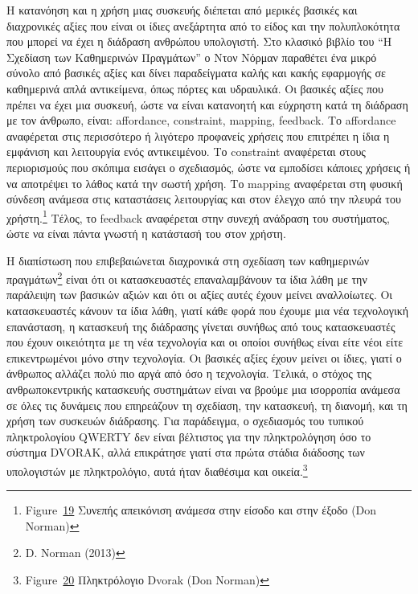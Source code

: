 \documentclass[
]{article}
\begin{document}
Η κατανόηση και η χρήση μιας συσκευής διέπεται από μερικές βασικές και
διαχρονικές αξίες που είναι οι ίδιες ανεξάρτητα από το είδος και την
πολυπλοκότητα που μπορεί να έχει η διάδραση ανθρώπου υπολογιστή. Στο
κλασικό βιβλίο του ``Η Σχεδίαση των Καθημερινών Πραγμάτων'' ο Ντον
Νόρμαν παραθέτει ένα μικρό σύνολο από βασικές αξίες και δίνει
παραδείγματα καλής και κακής εφαρμογής σε καθημερινά απλά αντικείμενα,
όπως πόρτες και υδραυλικά. Οι βασικές αξίες που πρέπει να έχει μια
συσκευή, ώστε να είναι κατανοητή και εύχρηστη κατά τη διάδραση με τον
άνθρωπο, είναι: affordance, constraint, mapping, feedback. Το affordance
αναφέρεται στις περισσότερο ή λιγότερο προφανείς χρήσεις που επιτρέπει η
ίδια η εμφάνιση και λειτουργία ενός αντικειμένου. Το constraint
αναφέρεται στους περιορισμούς που σκόπιμα εισάγει ο σχεδιασμός, ώστε να
εμποδίσει κάποιες χρήσεις ή να αποτρέψει το λάθος κατά την σωστή χρήση.
Το mapping αναφέρεται στη φυσική σύνδεση ανάμεσα στις καταστάσεις
λειτουργίας και στον έλεγχο από την πλευρά του χρήστη.\footnote{Figure~\protect\hyperlink{fig:mapping-principle}{19}
  Συνεπής απεικόνιση ανάμεσα στην είσοδο και στην έξοδο (Don Norman)}
Τέλος, το feedback αναφέρεται στην συνεχή ανάδραση του συστήματος, ώστε
να είναι πάντα γνωστή η κατάστασή του στον χρήστη.

Η διαπίστωση που επιβεβαιώνεται διαχρονικά στη σχεδίαση των καθημερινών
πραγμάτων\footnote{D. Norman (2013)} είναι ότι οι κατασκευαστές
επαναλαμβάνουν τα ίδια λάθη με την παράλειψη των βασικών αξιών και ότι
οι αξίες αυτές έχουν μείνει αναλλοίωτες. Οι κατασκευαστές κάνουν τα ίδια
λάθη, γιατί κάθε φορά που έχουμε μια νέα τεχνολογική επανάσταση, η
κατασκευή της διάδρασης γίνεται συνήθως από τους κατασκευαστές που έχουν
οικειότητα με τη νέα τεχνολογία και οι οποίοι συνήθως είναι είτε νέοι
είτε επικεντρωμένοι μόνο στην τεχνολογία. Οι βασικές αξίες έχουν μείνει
οι ίδιες, γιατί ο άνθρωπος αλλάζει πολύ πιο αργά από όσο η τεχνολογία.
Τελικά, ο στόχος της ανθρωποκεντρικής κατασκευής συστημάτων είναι να
βρούμε μια ισορροπία ανάμεσα σε όλες τις δυνάμεις που επηρεάζουν τη
σχεδίαση, την κατασκευή, τη διανομή, και τη χρήση των συσκευών
διάδρασης. Για παράδειγμα, ο σχεδιασμός του τυπικού πληκτρολογίου QWERTY
δεν είναι βέλτιστος για την πληκτρολόγηση όσο το σύστημα DVORAK, αλλά
επικράτησε γιατί στα πρώτα στάδια διάδοσης των υπολογιστών με
πληκτρολόγιο, αυτά ήταν διαθέσιμα και οικεία.\footnote{Figure~\protect\hyperlink{fig:dvorak-keyboard}{20}
  Πληκτρόλογιο Dvorak (Don Norman)}
\end{document}
